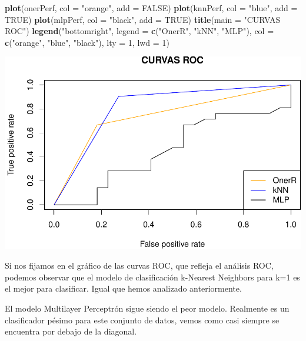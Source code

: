 \documentclass[]{article}
\newenvironment{Shaded}{\begin{snugshade}}{\end{snugshade}}
\newcommand{\DataTypeTok}[1]{\textcolor[rgb]{0.13,0.29,0.53}{#1}}
\newcommand{\DecValTok}[1]{\textcolor[rgb]{0.00,0.00,0.81}{#1}}
\newcommand{\KeywordTok}[1]{\textcolor[rgb]{0.13,0.29,0.53}{\textbf{#1}}}
\newcommand{\NormalTok}[1]{#1}
\newcommand{\OtherTok}[1]{\textcolor[rgb]{0.56,0.35,0.01}{#1}}
\newcommand{\StringTok}[1]{\textcolor[rgb]{0.31,0.60,0.02}{#1}}
\begin{document}
\begin{Shaded}
\begin{Highlighting}[]
\KeywordTok{plot}\NormalTok{(onerPerf, }\DataTypeTok{col =} \StringTok{"orange"}\NormalTok{, }\DataTypeTok{add =} \OtherTok{FALSE}\NormalTok{)}
\KeywordTok{plot}\NormalTok{(knnPerf, }\DataTypeTok{col =} \StringTok{"blue"}\NormalTok{, }\DataTypeTok{add =} \OtherTok{TRUE}\NormalTok{)}
\KeywordTok{plot}\NormalTok{(mlpPerf, }\DataTypeTok{col =} \StringTok{"black"}\NormalTok{, }\DataTypeTok{add =} \OtherTok{TRUE}\NormalTok{)}
\KeywordTok{title}\NormalTok{(}\DataTypeTok{main =} \StringTok{"CURVAS ROC"}\NormalTok{)}
\KeywordTok{legend}\NormalTok{(}\StringTok{"bottomright"}\NormalTok{, }\DataTypeTok{legend =} \KeywordTok{c}\NormalTok{(}\StringTok{"OnerR"}\NormalTok{, }\StringTok{"kNN"}\NormalTok{, }\StringTok{"MLP"}\NormalTok{), }
	\DataTypeTok{col =} \KeywordTok{c}\NormalTok{(}\StringTok{"orange"}\NormalTok{, }\StringTok{"blue"}\NormalTok{, }\StringTok{"black"}\NormalTok{), }
	\DataTypeTok{lty =} \DecValTok{1}\NormalTok{, }\DataTypeTok{lwd =} \DecValTok{1}\NormalTok{)}
\end{Highlighting}
\end{Shaded}

\includegraphics{document_files/figure-latex/unnamed-chunk-12-1.pdf}

\newpage

Si nos fijamos en el gráfico de las curvas ROC, que refleja el análisis ROC, podemos observar que el modelo de clasificación k-Nearest Neighbors para k=1 es el mejor para clasificar. Igual que hemos analizado anteriormente. 

El modelo Multilayer Perceptrón sigue siendo el peor modelo. Realmente es un clasificador pésimo para este conjunto de datos, vemos como casi siempre se encuentra por debajo de la diagonal.
\end{document}
